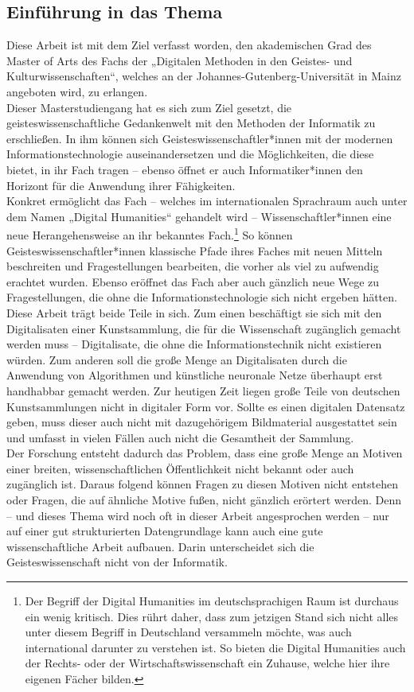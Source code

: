 \documentclass[a4paper,12pt,ngerman]{article}
\begin{document}
\subsection{Einführung in das Thema}
Diese Arbeit ist mit dem Ziel verfasst worden, den akademischen Grad des Master of Arts des Fachs der „Digitalen Methoden in den Geistes- und Kulturwissenschaften“, welches an der Johannes-Gutenberg-Universität in Mainz angeboten wird, zu erlangen. \\
Dieser Masterstudiengang hat es sich zum Ziel gesetzt, die geisteswissenschaftliche Gedankenwelt mit den Methoden der Informatik zu erschließen. In ihm können sich Geisteswissenschaftler*innen mit der modernen Informationstechnologie auseinandersetzen und die Möglichkeiten, die diese bietet, in ihr Fach tragen – ebenso öffnet er auch Informatiker*innen den Horizont für die Anwendung ihrer Fähigkeiten. \\
Konkret ermöglicht das Fach – welches im internationalen Sprachraum auch unter dem Namen „Digital Humanities“ gehandelt wird – Wissenschaftler*innen eine neue Herangehensweise an ihr bekanntes Fach.\footnote{Der Begriff der Digital Humanities im deutschsprachigen Raum ist durchaus ein wenig kritisch. Dies rührt daher, dass zum jetzigen Stand sich nicht alles unter diesem Begriff in Deutschland versammeln möchte, was auch international darunter zu verstehen ist. So bieten die Digital Humanities auch der Rechts- oder der Wirtschaftswissenschaft ein Zuhause, welche hier ihre eigenen Fächer bilden.}  So können Geisteswissenschaftler*innen klassische Pfade ihres Faches mit neuen Mitteln beschreiten und Fragestellungen bearbeiten, die vorher als viel zu aufwendig erachtet wurden. Ebenso eröffnet das Fach aber auch gänzlich neue Wege zu Fragestellungen, die ohne die Informationstechnologie sich nicht ergeben hätten. \\
Diese Arbeit trägt beide Teile in sich. Zum einen beschäftigt sie sich mit den Digitalisaten einer Kunstsammlung, die für die Wissenschaft zugänglich gemacht werden muss – Digitalisate, die ohne die Informationstechnik nicht existieren würden. Zum anderen soll die große Menge an Digitalisaten durch die Anwendung von Algorithmen und künstliche neuronale Netze überhaupt erst handhabbar gemacht werden.
Zur heutigen Zeit liegen große Teile von deutschen Kunstsammlungen nicht in digitaler Form vor. Sollte es einen digitalen Datensatz geben, muss dieser auch nicht mit dazugehörigem Bildmaterial ausgestattet sein und umfasst in vielen Fällen auch nicht die Gesamtheit der Sammlung. \\
Der Forschung entsteht dadurch das Problem, dass eine große Menge an Motiven einer breiten, wissenschaftlichen Öffentlichkeit nicht bekannt oder auch zugänglich ist. Daraus folgend können Fragen zu diesen Motiven nicht entstehen oder Fragen, die auf ähnliche Motive fußen, nicht gänzlich erörtert werden. Denn – und dieses Thema wird noch oft in dieser Arbeit angesprochen werden – nur auf einer gut strukturierten Datengrundlage kann auch eine gute wissenschaftliche Arbeit aufbauen. Darin unterscheidet sich die Geisteswissenschaft nicht von der Informatik. \\
\end{document}
